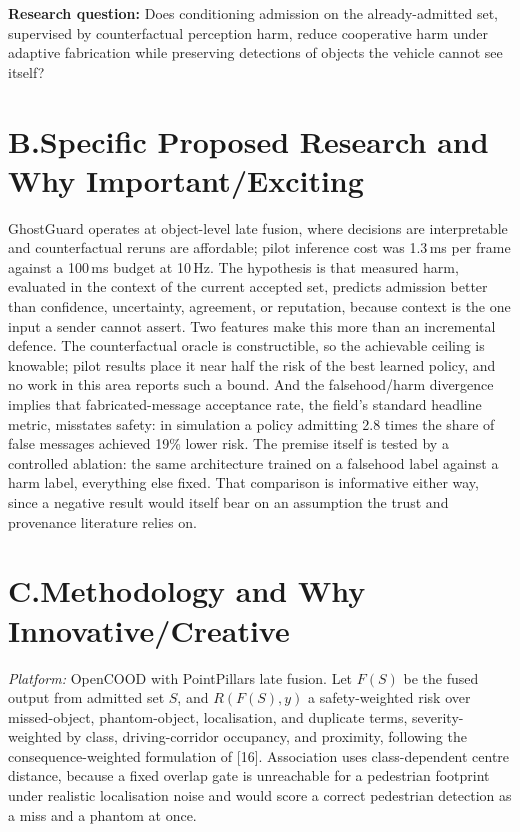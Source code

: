 \documentclass[11pt]{article}
\begin{document}
\textbf{Research question:} Does conditioning admission on the already-admitted
set, supervised by counterfactual perception harm, reduce cooperative harm
under adaptive fabrication while preserving detections of objects the vehicle
cannot see itself?

\section{B.\quad Specific Proposed Research and Why Important/Exciting}

GhostGuard operates at object-level late fusion, where decisions are
interpretable and counterfactual reruns are affordable; pilot inference cost was
1.3\,ms per frame against a 100\,ms budget at 10\,Hz. The hypothesis is that
measured harm, evaluated in the context of the current accepted set, predicts
admission better than confidence, uncertainty, agreement, or reputation, because
context is the one input a sender cannot assert. Two features make this more
than an incremental defence. The counterfactual oracle is constructible, so the
achievable ceiling is knowable; pilot results place it near half the risk of the
best learned policy, and no work in this area reports such a bound. And the
falsehood/harm divergence implies that fabricated-message acceptance rate, the
field's standard headline metric, misstates safety: in simulation a policy
admitting 2.8 times the share of false messages achieved 19\% lower risk. The
premise itself is tested by a controlled ablation: the same architecture trained
on a falsehood label against a harm label, everything else fixed. That
comparison is informative either way, since a negative result would itself bear
on an assumption the trust and provenance literature relies on.

\section{C.\quad Methodology and Why Innovative/Creative}

\emph{Platform:} OpenCOOD with PointPillars late fusion. Let $F(S)$ be the fused
output from admitted set $S$, and $R(F(S), y)$ a safety-weighted risk over
missed-object, phantom-object, localisation, and duplicate terms,
severity-weighted by class, driving-corridor occupancy, and proximity, following
the consequence-weighted formulation of [16]. Association uses class-dependent
centre distance, because a fixed overlap gate is unreachable for a pedestrian
footprint under realistic localisation noise and would score a correct
pedestrian detection as a miss and a phantom at once.
\end{document}
